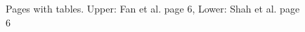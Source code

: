 \documentclass[]{article}
\begin{document}
\begin{figure}
\begin{subfigure}[b]{0.425\textwidth}
     \end{subfigure}
     \hfill
     \begin{subfigure}[b]{0.425\textwidth}
         \centering
     \end{subfigure}
    \caption{Pages with tables. Upper: Fan et al. \cite{fan_hierarchical_2018} page 6, Lower: Shah et al. \cite{shah_cycle-consistency_2019} page 6}
    \label{fig:example_tables}
\end{figure}
\end{document}

